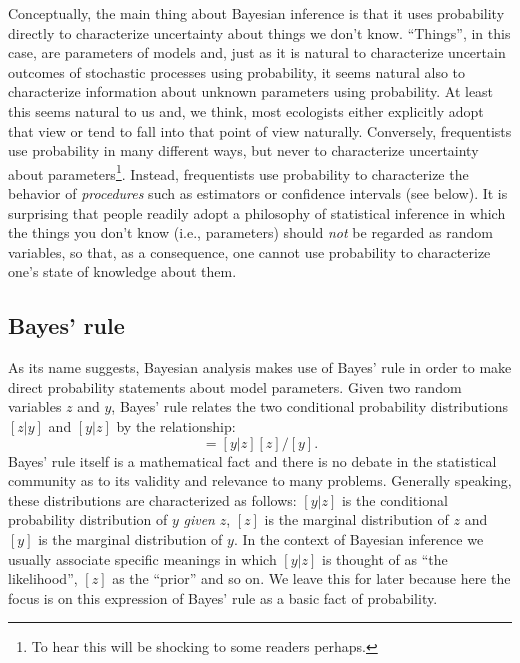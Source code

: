 Conceptually, the main thing about Bayesian inference is that it uses
probability directly to characterize uncertainty about things we don't
know.  ``Things'', in this case, are parameters of models and, just as
it is natural to characterize uncertain outcomes of stochastic
processes using probability, it seems natural also to characterize
information about unknown parameters using probability. At least
this seems natural to us and, we think, most ecologists either
explicitly adopt that view or tend to fall into that point of view
naturally.  Conversely, frequentists use probability in many different
ways, but never to characterize uncertainty about
parameters\footnote{To hear this will be shocking to some readers
  perhaps.}. Instead, frequentists use probability to characterize the
behavior of {\it procedures} such as estimators or confidence
intervals (see below). It is surprising that people readily
adopt a philosophy of statistical inference in which the things you
don't know (i.e., parameters) should {\it not} be regarded as random
variables, so that, as a consequence, one cannot use probability to
characterize one's state of knowledge about them.


\subsection{Bayes' rule}

As its name suggests, Bayesian analysis makes use of Bayes' rule in
order to make direct probability statements about model
parameters. Given two random variables $z$ and $y$, Bayes' rule relates
the two conditional probability distributions $[z|y]$ and $[y|z]$ by
the relationship:
\begin{equation}
[z|y] = [y|z][z]/[y].
\label{glms.eq.bayes}
\end{equation}
Bayes' rule itself is a mathematical fact and there is no debate in
the statistical community as to its validity and relevance to many
problems. Generally speaking, these distributions are characterized as
follows: $[y|z]$ is the conditional probability distribution of $y$
{\it given} $z$, $[z]$ is the marginal distribution of $z$ and $[y]$
is the marginal distribution of $y$. In the context of Bayesian
inference we usually associate specific meanings in which $[y|z]$ is
thought of as ``the likelihood'', $[z]$ as the ``prior'' and so on. We
leave this for later because here the focus is on this expression of
Bayes' rule as a basic fact of probability.

